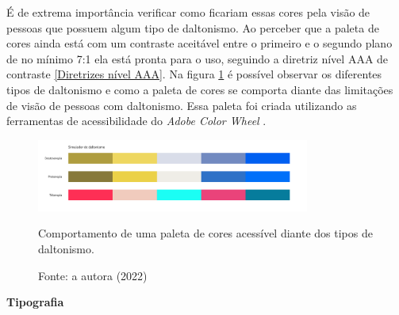 {É de extrema importância verificar como ficariam essas cores pela visão de pessoas que possuem algum tipo de daltonismo. Ao perceber que a paleta de cores ainda está com um contraste aceitável entre o primeiro e o segundo plano de no mínimo 7:1 ela está pronta para o uso, seguindo a diretriz nível AAA de contraste \ref{Diretrizes nível AAA}. Na figura \ref{fig2:style} é possível observar os diferentes tipos de daltonismo e como a paleta de cores se comporta diante das limitações de visão de pessoas com daltonismo. Essa paleta foi criada utilizando as ferramentas de acessibilidade do \textit{Adobe Color Wheel} \cite{ADOBE}.
 \begin{figure}[ht]
        \centering
    	\includegraphics[width=0.8\textwidth]{images/paleta_daltonismo.png}
        \caption{Comportamento de uma paleta de cores acessível diante dos tipos de daltonismo.}
        \caption*{Fonte: a autora (2022)}
        \label{fig2:style}
\end{figure}  


\newpage

{\textbf{Tipografia}}

}
